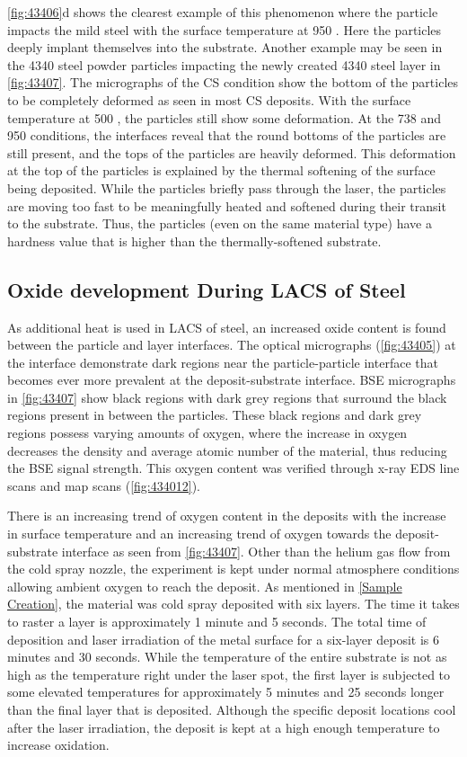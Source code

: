 \ref{fig:43406}d shows the clearest example of this phenomenon where the particle impacts the mild steel with the surface temperature at 950 \celsius{}. Here the particles deeply implant themselves into the substrate. Another example may be seen in the 4340 steel powder particles impacting the newly created 4340 steel layer in \ref{fig:43407}. The micrographs of the CS condition show the bottom of the particles to be completely deformed as seen in most CS deposits. With the surface temperature at 500 \celsius{}, the particles still show some deformation. At the 738 \celsius{} and 950 \celsius{} conditions, the interfaces reveal that the round bottoms of the particles are still present, and the tops of the particles are heavily deformed. This deformation at the top of the particles is explained by the thermal softening of the surface being deposited. While the particles briefly pass through the laser, the particles are moving too fast to be meaningfully heated and softened during their transit to the substrate. Thus, the particles (even on the same material type) have a hardness value that is higher than the thermally-softened substrate. 


\subsection*{Oxide development During LACS of Steel}


As additional heat is used in LACS of steel, an increased oxide content is found between the particle and layer interfaces. The optical micrographs (\ref{fig:43405}) at the interface demonstrate dark regions near the particle-particle interface that becomes ever more prevalent at the deposit-substrate interface. BSE micrographs in \ref{fig:43407} show black regions with dark grey regions that surround the black regions present in between the particles. These black regions and dark grey regions possess varying amounts of oxygen, where the increase in oxygen decreases the density and average atomic number of the material, thus reducing the BSE signal strength. This oxygen content was verified through x-ray EDS line scans and map scans (\ref{fig:434012}). 

There is an increasing trend of oxygen content in the deposits with the increase in surface temperature and an increasing trend of oxygen towards the deposit-substrate interface as seen from \ref{fig:43407}. Other than the helium gas flow from the cold spray nozzle, the experiment is kept under normal atmosphere conditions allowing ambient oxygen to reach the deposit. As mentioned in \ref{Sample Creation}, the material was cold spray deposited with six layers. The time it takes to raster a layer is approximately 1 minute and 5 seconds. The total time of deposition and laser irradiation of the metal surface for a six-layer deposit is 6 minutes and 30 seconds. While the temperature of the entire substrate is not as high as the temperature right under the laser spot, the first layer is subjected to some elevated temperatures for approximately 5 minutes and 25 seconds longer than the final layer that is deposited. Although the specific deposit locations cool after the laser irradiation, the deposit is kept at a high enough temperature to increase oxidation.


